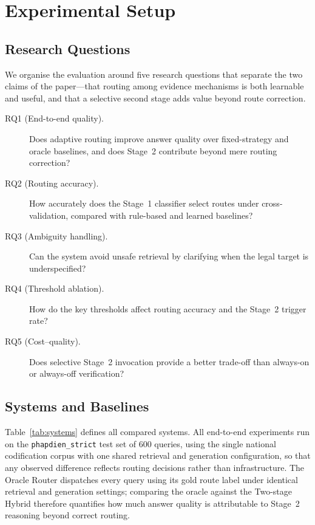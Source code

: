 \documentclass[pdflatex,sn-mathphys-num]{sn-jnl}
\begin{document}
\section{Experimental Setup}\label{sec:eval}

\subsection{Research Questions}\label{subsec:rqs}

We organise the evaluation around five research questions that separate the
two claims of the paper---that routing among evidence mechanisms is both
learnable and useful, and that a selective second stage adds value beyond
route correction.

\begin{description}
\item[RQ1 (End-to-end quality).] Does adaptive routing improve answer quality
over fixed-strategy and oracle baselines, and does Stage~2 contribute beyond
mere routing correction?
\item[RQ2 (Routing accuracy).] How accurately does the Stage~1 classifier
select routes under cross-validation, compared with rule-based and learned
baselines?
\item[RQ3 (Ambiguity handling).] Can the system avoid unsafe retrieval by
clarifying when the legal target is underspecified?
\item[RQ4 (Threshold ablation).] How do the key thresholds affect routing
accuracy and the Stage~2 trigger rate?
\item[RQ5 (Cost--quality).] Does selective Stage~2 invocation provide a better
trade-off than always-on or always-off verification?
\end{description}

\subsection{Systems and Baselines}\label{subsec:systems}

Table~\ref{tab:systems} defines all compared systems. All end-to-end
experiments run on the \texttt{phapdien\_strict} test set of $600$ queries,
using the single national codification corpus with one shared retrieval and
generation configuration, so that any observed difference reflects routing
decisions rather than infrastructure. The Oracle Router dispatches every query
using its gold route label under identical retrieval and generation settings;
comparing the oracle against the Two-stage Hybrid therefore quantifies how
much answer quality is attributable to Stage~2 reasoning beyond correct
routing.
\end{document}

